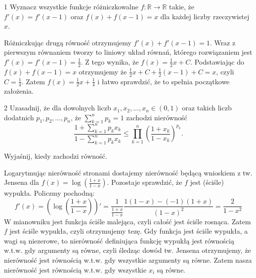 \documentclass{../note}
\begin{document}
\begin{zadanie}{1}
Wyznacz wszystkie funkcje różniczkowalne $f : \mathbb{R} \to \mathbb{R}$ takie, że $f'(x) = f'(x - 1)$ oraz $f(x) + f(x - 1) = x$ dla każdej liczby rzeczywistej $x$.
\end{zadanie}
\begin{rozwiazanie}
Różniczkując drugą równość otrzymujemy $f'(x) + f'(x - 1) = 1$. Wraz z pierwszym równaniem tworzy to liniowy układ równań, którego rozwiązaniem jest $f'(x) = f'(x-1) = \frac12$. Z tego wynika, że $f(x) = \frac12x + C$. Podstawiając do $f(x) + f(x - 1) = x$ otrzymujemy że $\frac12x + C + \frac12(x-1) + C = x$, czyli $C = \frac14$. Zatem $f(x) = \frac12x + \frac14$ i łatwo sprawdzić, że to spełnia początkowe założenia.
\end{rozwiazanie}

\begin{zadanie}{2}
Uzasadnij, że dla dowolnych liczb $x_1, x_2, \dots, x_n \in (0, 1)$ oraz takich liczb dodatnich $p_1, p_2, \dots, p_n$, że $\sum_{k=1}^n p_k = 1$ zachodzi nierówność
$$ \frac{1 + \sum_{k=1}^n p_k x_k}{1 - \sum_{k=1}^n p_k x_k} \le \prod_{k=1}^n \left( \frac{1 + x_k}{1 - x_k} \right)^{p_k} . $$

Wyjaśnij, kiedy zachodzi równość.
\end{zadanie}
\begin{rozwiazanie}
Logarytmując nierówność stronami dostajemy nierówność będącą wnioskiem z tw. Jensena dla $f(x) = \log\left(\frac{1 + x}{1 - x}\right)$. Pozostaje sprawdzić, że $f$ jest (ściśle) wypukła. Policzmy pochodną:
\[f'(x) = \left(\log\left(\frac{1 + x}{1 - x}\right)\right)' = \frac{1}{\frac{1 + x}{1 - x}} \frac{1(1-x) - (-1)(1+x)}{(1-x)^2} = \frac{2}{1-x^2}\]
W mianowniku jest funkcja ściśle malejąca, czyli całość jest ściśle rosnąca. Zatem $f$ jest ściśle wypukła, czyli otrzymujemy tezę. Gdy funkcja jest ściśle wypukła, a wagi są niezerowe, to nierówność definiująca funkcję wypukłą jest równością w.t.w. gdy argumenty są równe, czyli śledząc dowód tw. Jensena otrzymujemy, że nierówność jest równością w.t.w. gdy wszystkie argumenty są równe. Zatem nasza nierówność jest równością w.t.w. gdy wszystkie $x_i$ są równe.
\end{rozwiazanie}
\end{document}
